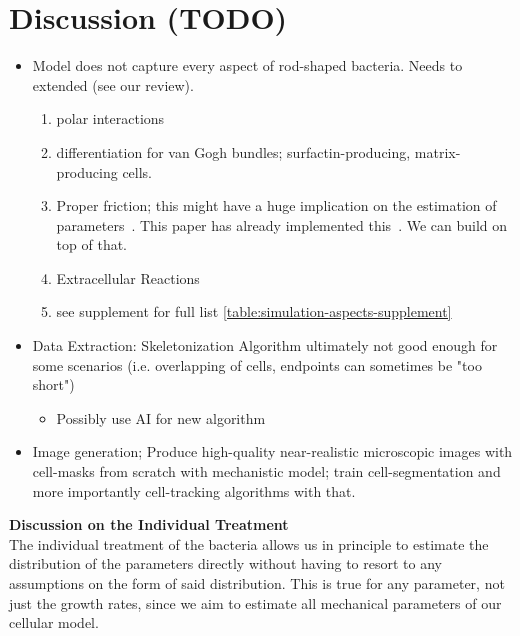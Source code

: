 \documentclass{article}
\begin{document}
\section{Discussion (TODO)}
\label{section:discussion}

\begin{itemize}
    \item Model does not capture every aspect of rod-shaped bacteria. Needs to extended (see our
        review).
    \begin{enumerate}
        \item polar interactions
        \item differentiation for van Gogh bundles; surfactin-producing, matrix-producing cells.
        \item Proper friction; this might have a huge implication on the estimation of
            parameters~\cite{Grant2014}.
            This paper has already implemented this~\cite{Doumic2020}.
            We can build on top of that.
        \item Extracellular Reactions~\cite{Li2025}
        \item see supplement for full list \ref{table:simulation-aspects-supplement}
    \end{enumerate}
    \item Data Extraction: Skeletonization Algorithm ultimately not good enough for some scenarios
        (i.e. overlapping of cells, endpoints can sometimes be "too short")
    \begin{itemize}
        \item Possibly use AI for new algorithm
    \end{itemize}
    \item Image generation; Produce high-quality near-realistic microscopic images with cell-masks
        from scratch with mechanistic model; train cell-segmentation and more importantly
        cell-tracking algorithms with that.
\end{itemize}

\textbf{Discussion on the Individual Treatment}\\
The individual treatment of the bacteria allows us in principle to estimate the distribution of the
parameters directly without having to resort to any assumptions on the form of said distribution.
This is true for any parameter, not just the growth rates, since we aim to estimate all mechanical
parameters of our cellular model.
\end{document}
